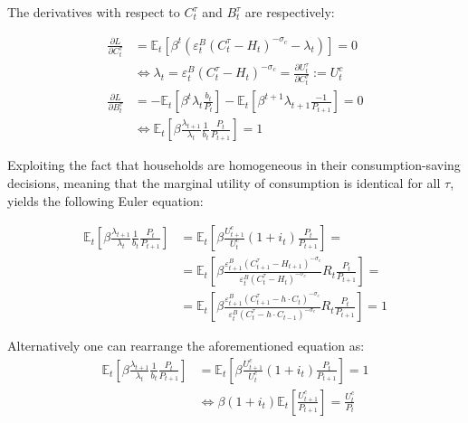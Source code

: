\documentclass{pracamgr}
\numberwithin{equation}{section}
\begin{document}
The derivatives with respect to $C_{t}^{\tau}$ and $B_{t}^{\tau}$ are respectively:

\begin{align}
\frac{\partial L}{\partial C_{t}^{\tau}} &= \mathbb{E}_{t} \left[ \beta^{t} \left( \varepsilon_{t}^{B} (
C_{t}^{\tau} - H_{t} )^{-\sigma_{c}} - \lambda_{t} \right) \right]  = 0  \nonumber \\ 
& \iff \lambda_{t} =  \varepsilon_{t}^{B} (C_{t}^{\tau} - H_{t} )^{-\sigma_{c}} = \frac{\partial U_{t}^{\tau}}{\partial C_{t}^{\tau}} := U_{t}^{c} \label{FOC_C} \\
\frac{\partial L}{\partial B_{t}^{\tau}} &= -\mathbb{E}_{t} \left[ \beta^{t} \lambda_{t} \frac{b_{t}}{P_{t}} \right] - \mathbb{E}_{t} \left[ \beta^{t+1} \lambda_{t+1} \frac{-1}{P_{t+1}} \right] = 0 \nonumber \\
& \iff \mathbb{E}_{t} \left[ \beta \frac{\lambda_{t+1}}{\lambda_{t}} \frac{1}{b_{t}} \frac{P_{t}}{P_{t+1}} \right] = 1 \label{FOC_B} 
\end{align}

Exploiting the fact that households are homogeneous in their consumption-saving decisions,  meaning that the marginal utility of consumption is identical for all $\tau$, yields the following Euler equation:

\begin{align}
\mathbb{E}_{t} \left[ \beta \frac{\lambda_{t+1}}{\lambda_{t}} \frac{1}{b_{t}}\frac{P_{t}}{P_{t+1}} \right] &= \mathbb{E}_{t} \left[ \beta \frac{U^{c}_{t+1}}{U^{c}_{t}} (1 + i_{t}) \frac{P_{t}}{P_{t+1}} \right] = \nonumber \\
&= \mathbb{E}_{t} \left[ \beta \frac{\varepsilon_{t+1}^{B} (C_{t+1}^{\tau} - H_{t+1} )^{-\sigma_{c}}}{\varepsilon_{t}^{B} (C_{t}^{\tau} - H_{t} )^{-\sigma_{c}}} R_{t} \frac{P_{t}}{P_{t+1}} \right] = \nonumber \\
&= \mathbb{E}_{t} \left[ \beta \frac{\varepsilon_{t+1}^{B} (C_{t+1}^{\tau} - h \cdot C_{t} )^{-\sigma_{c}}}{\varepsilon_{t}^{B} (C_{t}^{\tau} - h \cdot C_{t-1} )^{-\sigma_{c}}} R_{t} \frac{P_{t}}{P_{t+1}} \right] = 1
\end{align}

Alternatively one can rearrange the aforementioned equation as:
\begin{align}
\mathbb{E}_{t} \left[ \beta \frac{\lambda_{t+1}}{\lambda_{t}} \frac{1}{b_{t}}\frac{P_{t}}{P_{t+1}} \right] &= \mathbb{E}_{t} \left[ \beta \frac{U^{c}_{t+1}}{U^{c}_{t}} (1 + i_{t}) \frac{P_{t}}{P_{t+1}} \right] = 1 \nonumber \\
& \iff \beta (1 + i_{t}) \mathbb{E}_{t} \left[ \frac{U_{t+1}^{c}}{P_{t+1}} \right] = \frac{U_{t}^{c}}{P_{t}}
\end{align}
\end{document}
